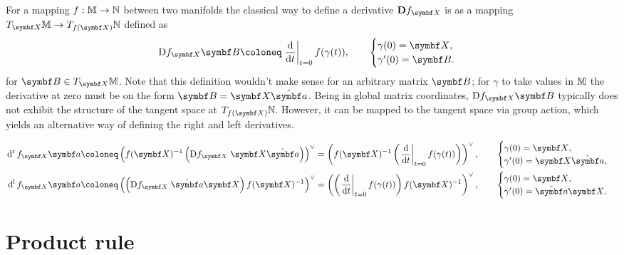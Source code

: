For a mapping $f : {\mathbb{M}} \rightarrow {\mathbb{N}}$ between two manifolds the classical way to define a derivative $\mathbf{D} f_\X$ is as a mapping $T_\X \M \rightarrow T_{f(\X)} \N$ defined as
\begin{equation}
  \mathrm{D} f_\X \B \coloneq \left. \frac{\mathrm{d}}{\mathrm{d}t} \right|_{t = 0} f(\gamma(t)), \qquad \begin{cases}
    \gamma(0) = \X, \\
    \gamma'(0) = \B.
  \end{cases}
\end{equation}
for $\B \in T_\X \M$. Note that this definition wouldn't make sense for an arbitrary matrix $\B$; for $\gamma$ to take values in ${\mathbb{M}}$ the derivative at zero must be on the form $\B = \X \hat \a$. Being in global matrix coordinates, $\mathrm{D} f_\X \B$ typically does not exhibit the structure of the tangent space at $T_{f(\X)} \N$. However, it can be mapped to the tangent space via group action, which yields an alternative way of defining the right and left derivatives.

\begin{equation}
  \label{eq:rght_deriv_traditional}
  \begin{aligned}
    \dr f_\X \a & \coloneq \left( f(\X)^{-1} \left( \mathrm{D} f_\X \; \X \hat \a \right) \right)^{\vee} = \left( f(\X)^{-1} \left( \left. \frac{\mathrm{d}}{\mathrm{d}t} \right|_{t = 0} f(\gamma(t)) \right) \right)^\vee, \qquad \begin{cases} \gamma(0) = \X, \\ \gamma'(0) = \X \hat \a, \end{cases}  \\
    \dl f_\X \a & \coloneq \left( \left( \mathrm{D} f_\X \; \hat \a \X \right) f(\X)^{-1} \right)^{\vee} = \left( \left( \left. \frac{\mathrm{d}}{\mathrm{d}t} \right|_{t = 0} f(\gamma(t)) \right) f(\X)^{-1}  \right)^\vee, \qquad \begin{cases} \gamma(0) = \X, \\ \gamma'(0) = \hat \a \X. \end{cases}
  \end{aligned}
\end{equation}


\section{Product rule}


